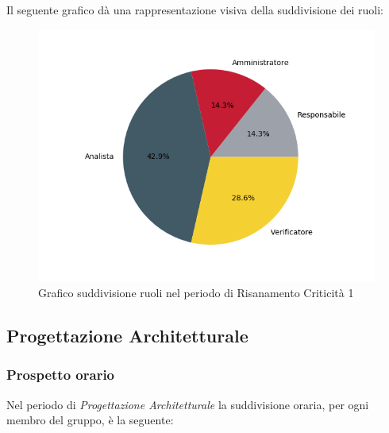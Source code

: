 Il seguente grafico dà una rappresentazione visiva della suddivisione dei ruoli:
\begin{figure}[H]
	\centering
  		\includegraphics[width=1\linewidth]{./images/torta_rc1.png}
  		\caption{Grafico suddivisione ruoli nel periodo di Risanamento Criticità 1}
  		\label{fig:grafico suddivione ruoli periodo di rc1}
\end{figure}


\subsection{Progettazione Architetturale}
\label{PPA}
\subsubsection{Prospetto orario}

Nel periodo di \textit{Progettazione Architetturale} la suddivisione oraria, per ogni membro del gruppo, è la seguente:


